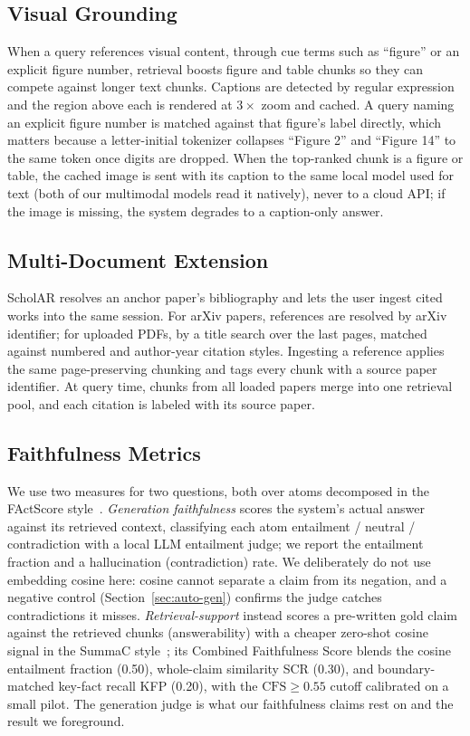 \documentclass[11pt,letterpaper]{article}
\begin{document}
\subsection{Visual Grounding}
When a query references visual content, through cue terms such as ``figure'' or an explicit
figure number, retrieval boosts figure and table chunks so they can compete against longer
text chunks. Captions are detected by regular expression and the region above each is rendered
at $3\times$ zoom and cached. A query naming an explicit figure number is matched against that
figure's label directly, which matters because a letter-initial tokenizer collapses ``Figure 2''
and ``Figure 14'' to the same token once digits are dropped. When the top-ranked chunk is a
figure or table, the cached image is sent with its caption to the same local model used for text
(both of our multimodal models read it natively), never to a cloud API; if the image is missing,
the system degrades to a caption-only answer.

\subsection{Multi-Document Extension}
ScholAR resolves an anchor paper's bibliography and lets the user ingest cited
works into the same session. For arXiv papers, references are resolved by arXiv
identifier; for uploaded PDFs, by a title search over the last pages, matched
against numbered and author-year citation styles. Ingesting a reference applies the
same page-preserving chunking and tags every chunk with a source paper identifier.
At query time, chunks from all loaded papers merge into one retrieval pool, and each
citation is labeled with its source paper.

\subsection{Faithfulness Metrics}
\label{sec:method-faith}
We use two measures for two questions, both over atoms decomposed in the FActScore
style~\citep{min2023factscore}. \emph{Generation faithfulness} scores the system's actual answer
against its retrieved context, classifying each atom entailment / neutral / contradiction with a
local LLM entailment judge; we report the entailment fraction and a hallucination (contradiction)
rate. We deliberately do not use embedding cosine here: cosine cannot separate a claim from its
negation, and a negative control (Section~\ref{sec:auto-gen}) confirms the judge catches
contradictions it misses. \emph{Retrieval-support} instead scores a pre-written gold claim against
the retrieved chunks (answerability) with a cheaper zero-shot cosine signal in the SummaC
style~\citep{laban2022summac}; its Combined Faithfulness Score blends the cosine entailment
fraction (0.50), whole-claim similarity SCR (0.30), and boundary-matched key-fact recall KFP
(0.20), with the $\mathrm{CFS}{\geq}0.55$ cutoff calibrated on a small pilot. The generation judge
is what our faithfulness claims rest on and the result we foreground.
\end{document}
